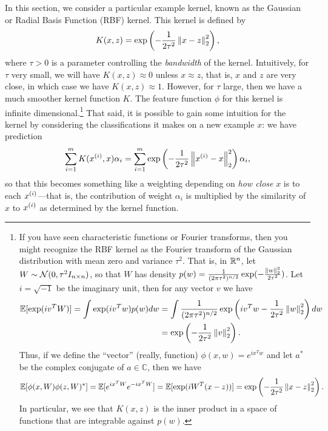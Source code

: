 \documentclass{article}
\newcommand{\represent}{\phi}
\begin{document}
In this section, we consider a particular example kernel, known as the
Gaussian or Radial Basis Function (RBF) kernel. This kernel is defined by
\begin{equation}
  \label{eqn:rbf-kernel}
  K(x, z) = \exp\left(-\frac{1}{2 \tau^2} \left\|{x - z}\right\|_2^2\right),
\end{equation}
where $\tau > 0$ is a parameter controlling the \emph{bandwidth} of the
kernel. Intuitively, for $\tau$ very small, we will have $K(x, z) \approx 0$
unless $x \approx z$, that is, $x$ and $z$ are very close, in which case we
have $K(x, z) \approx 1$. However, for $\tau$ large, then we have a much
smoother kernel function $K$.  The feature function $\represent$ for this
kernel is infinite dimensional.\footnote{If you have seen characteristic
  functions or Fourier transforms, then you might recognize the RBF kernel
  as the Fourier transform of the Gaussian distribution with mean zero and
  variance $\tau^2$. That is, in $\mathbb{R}^n$, let $W \sim \mathcal{N}(0, \tau^2 I_{n
    \times n})$, so that $W$ has density $p(w) = \frac{1}{(2 \pi
    \tau^2)^{n/2}} \exp(-\frac{\left\|{w}\right\|_2^2}{2 \tau^2})$.  Let $i = \sqrt{-1}$
  be the imaginary unit, then for any vector $v$ we have
  \begin{align*}
    \mathbb{E}[\exp(i v^T W)]
    = \int \exp(i v^T w) p(w) dw
    & = \int \frac{1}{(2 \pi \tau^2)^{n/2}}
    \exp\left(i v^T w - \frac{1}{2 \tau^2} \left\|{w}\right\|_2^2\right) dw \\
    & = \exp\left(-\frac{1}{2 \tau^2} \left\|{v}\right\|_2^2 \right).
  \end{align*}
  Thus, if we define the ``vector'' (really, function)
  $\phi(x, w) = e^{i x^T w}$ and let $a^*$ be the complex
  conjugate of $a \in \mathbb{C}$, then we have
  \begin{equation*}
    \mathbb{E}[\phi(x, W) \phi(z, W)^*]
    = \mathbb{E}[e^{i x^T W} e^{-i x^T W}]
    = \mathbb{E}[\exp(i W^T (x - z))]
    = \exp\left(-\frac{1}{2 \tau^2} \left\|{x - z}\right\|_2^2\right).
  \end{equation*}
  In particular, we see that $K(x, z)$ is the inner product
  in a space of functions that are integrable against $p(w)$.
}
That said, it is possible to gain some intuition for the kernel
by considering the classifications it makes on a new example $x$:
we have prediction
\begin{equation*}
  \sum_{i = 1}^m K({x^{(i)}}, x) \alpha_i
  = \sum_{i = 1}^m \exp\left(-\frac{1}{2 \tau^2} \left\|{{x^{(i)}} - x}\right\|_2^2\right)
  \alpha_i,
\end{equation*}
so that this becomes something like a weighting depending on
\emph{how close} $x$ is to each ${x^{(i)}}$---that is, the contribution
of weight $\alpha_i$ is multiplied by the similarity of $x$ to ${x^{(i)}}$
as determined by the kernel function.
\end{document}
